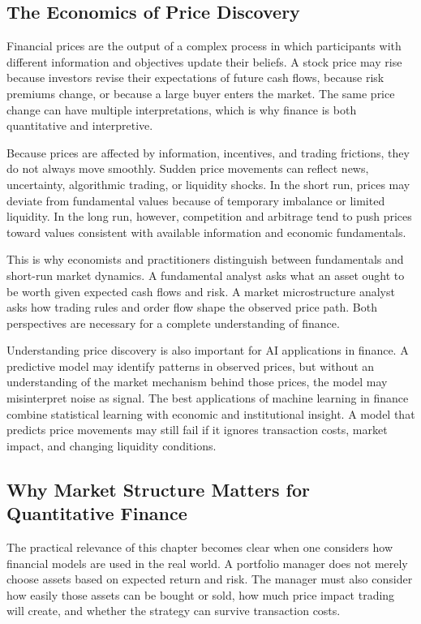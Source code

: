 \documentclass[../ai_in_finance]{subfiles}
\begin{document}
\subsection{The Economics of Price Discovery}

Financial prices are the output of a complex process in which participants with different information and objectives update their beliefs. A stock price may rise because investors revise their expectations of future cash flows, because risk premiums change, or because a large buyer enters the market. The same price change can have multiple interpretations, which is why finance is both quantitative and interpretive.

Because prices are affected by information, incentives, and trading frictions, they do not always move smoothly. Sudden price movements can reflect news, uncertainty, algorithmic trading, or liquidity shocks. In the short run, prices may deviate from fundamental values because of temporary imbalance or limited liquidity. In the long run, however, competition and arbitrage tend to push prices toward values consistent with available information and economic fundamentals.

This is why economists and practitioners distinguish between fundamentals and short-run market dynamics. A fundamental analyst asks what an asset ought to be worth given expected cash flows and risk. A market microstructure analyst asks how trading rules and order flow shape the observed price path. Both perspectives are necessary for a complete understanding of finance.

Understanding price discovery is also important for AI applications in finance. A predictive model may identify patterns in observed prices, but without an understanding of the market mechanism behind those prices, the model may misinterpret noise as signal. The best applications of machine learning in finance combine statistical learning with economic and institutional insight. A model that predicts price movements may still fail if it ignores transaction costs, market impact, and changing liquidity conditions.

\subsection{Why Market Structure Matters for Quantitative Finance}

The practical relevance of this chapter becomes clear when one considers how financial models are used in the real world. A portfolio manager does not merely choose assets based on expected return and risk. The manager must also consider how easily those assets can be bought or sold, how much price impact trading will create, and whether the strategy can survive transaction costs.
\end{document}
